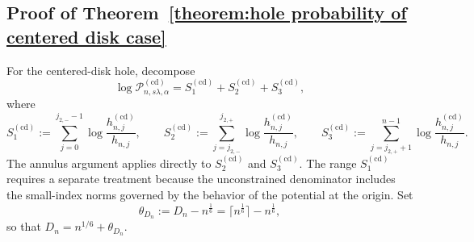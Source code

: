 \documentclass[a4paper]{article}
\numberwithin{equation}{section}
\begin{document}
\subsection{Proof of Theorem~\ref{theorem:hole probability of centered disk case}}
For the centered-disk hole, decompose
\[
  \log\mathcal{P}_{n,s\lambda,\alpha}^{(\mathrm{cd})}
  =S_1^{(\mathrm{cd})} +S_2^{(\mathrm{cd})}+S_3^{(\mathrm{cd})}, 
\]
where 
\[
S_1^{(\mathrm{cd})}:=\sum_{j=0}^{j_{2,-}-1}\log\frac{h_{n,j}^{(\mathrm{cd})}}{h_{n,j}}, \qquad
S_2^{(\mathrm{cd})}:=\sum_{j=j_{2,-}}^{j_{2,+}}\log\frac{h_{n,j}^{(\mathrm{cd})}}{h_{n,j}},\qquad
S_3^{(\mathrm{cd})}:=\sum_{j=j_{2,+}+1}^{n-1}\log\frac{h_{n,j}^{(\mathrm{cd})}}{h_{n,j}}. 
\]
The annulus argument applies directly to $S_2^{(\mathrm{cd})}$ and $S_3^{(\mathrm{cd})}$. The range $S_1^{(\mathrm{cd})}$ requires a separate treatment because the unconstrained denominator includes the small-index norms governed by the behavior of the potential at the origin. Set
\[
    \theta_{D_n}:=D_n-n^{\frac{1}{6}}=\bigl\lceil n^{\frac{1}{6}}\bigr\rceil-n^{\frac{1}{6}}, 
\]
so that $D_n=n^{1/6}+\theta_{D_n}$.
\end{document}
